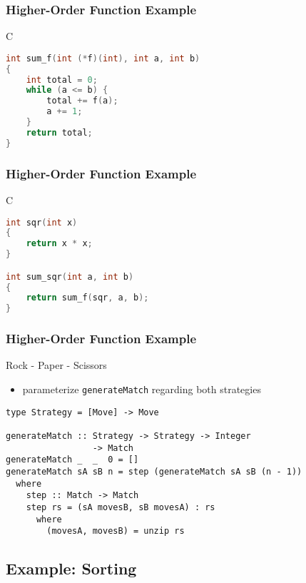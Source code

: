 \documentclass[dvipsnames]{beamer}
\theoremstyle{plain}
\begin{document}
\begin{frame}[fragile]
  \frametitle{Higher-Order Function Example}

  \begin{exampleblock}{C}
    \begin{lstlisting}[language=C]
int sum_f(int (*f)(int), int a, int b)
{
    int total = 0;
    while (a <= b) {
        total += f(a);
        a += 1;
    }
    return total;
}
    \end{lstlisting}
  \end{exampleblock}
\end{frame}

\begin{frame}[fragile]
  \frametitle{Higher-Order Function Example}

  \begin{exampleblock}{C}
    \begin{lstlisting}[language=C]
int sqr(int x)
{
    return x * x;
}

int sum_sqr(int a, int b)
{
    return sum_f(sqr, a, b);
}
    \end{lstlisting}
  \end{exampleblock}
\end{frame}

\begin{frame}[fragile]
  \frametitle{Higher-Order Function Example}

  \begin{exampleblock}{Rock - Paper - Scissors}
    \begin{itemize}
      \item parameterize \lstinline|generateMatch| regarding both strategies
    \end{itemize}

    \begin{lstlisting}
type Strategy = [Move] -> Move

generateMatch :: Strategy -> Strategy -> Integer
                 -> Match
generateMatch _  _  0 = []
generateMatch sA sB n = step (generateMatch sA sB (n - 1))
  where
    step :: Match -> Match
    step rs = (sA movesB, sB movesA) : rs
      where
        (movesA, movesB) = unzip rs
    \end{lstlisting}
  \end{exampleblock}
\end{frame}

\subsection{Example: Sorting}
\end{document}
